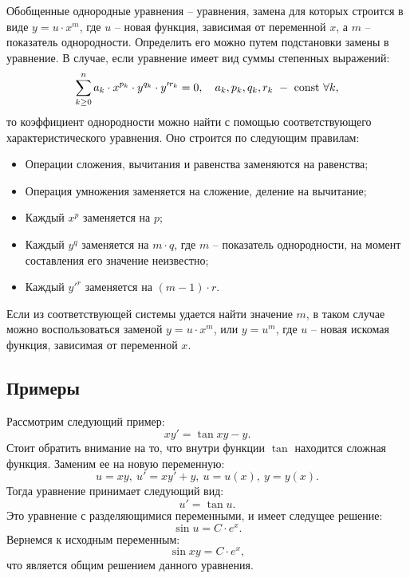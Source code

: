 	Обобщенные однородные уравнения -- уравнения, замена для которых строится в виде $y = u \cdot x^m$, где $u$ -- новая функция, зависимая от переменной $x$, а $m$ -- показатель однородности. Определить его можно путем подстановки замены в уравнение. В случае, если уравнение имеет вид суммы степенных выражений:
	\[ \sum_{k \ge 0}^n a_k \cdot x^{p_k} \cdot y^{q_k} \cdot y'^{r_k} = 0, \quad a_k, p_k, q_k, r_k ~ - ~ \mathrm{const} ~ \forall k, \]
	то коэффициент однородности можно найти с помощью соответствующего характеристического уравнения. Оно строится по следующим правилам:
	\begin{itemize}
		\item Операции сложения, вычитания и равенства заменяются на равенства;
		\item Операция умножения заменяется на сложение, деление на вычитание;
		\item Каждый $x^p$ заменяется на $p$;
		\item Каждый $y^q$ заменяется на $m \cdot q$, где $m$ -- показатель однородности, на момент составления его значение неизвестно;
		\item Каждый $y'^{r}$ заменяется на $(m - 1) \cdot r$.
	\end{itemize}
	Если из соответствующей системы удается найти значение $m$, в таком случае можно воспользоваться заменой $y = u \cdot x^m$, или $y = u^m$, где $u$ -- новая искомая функция, зависимая от переменной $x$.

	\subsection{Примеры}

		Рассмотрим следующий пример:
		\[ xy' = \tan{xy} - y. \]
		Стоит обратить внимание на то, что внутри функции $\tan$ находится сложная функция. Заменим ее на новую переменную:
		\[ u = xy, ~ u' = xy' + y, ~ u = u(x), ~ y = y(x). \]
		Тогда уравнение принимает следующий вид:
		\[ u' = \tan{u}. \]
		Это уравнение с разделяющимися переменными, и имеет следущее решение:
		\[ \sin{u} = C \cdot e^{x}. \]
		Вернемся к исходным переменным:
		\[ \sin{xy} = C \cdot e^{x}, \]
		что является общим решением данного уравнения.

